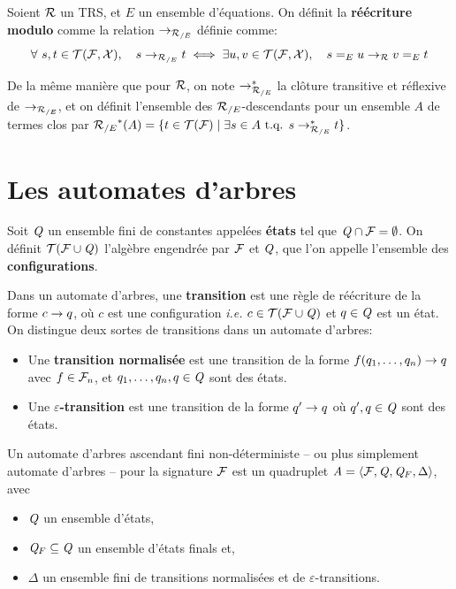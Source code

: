 \begin{definition}
  Soient $\mathcal R$ un TRS, et $E$ un ensemble d'équations. On définit la \textbf{réécriture modulo} comme la relation
  $\rightarrow_{\mathcal R_{/E}}$ définie comme:
  \[\forall\ s, t \in \mathcal{T(F, X)},\quad s \rightarrow_{\mathcal R_{/E}} t \; \Longleftrightarrow \; \exists u, v \in \mathcal{T(F, X)},\quad s =_E u \rightarrow_\mathcal R v =_E t\]
\end{definition}
De la même manière que pour $\mathcal R$, on note $\rightarrow_{\mathcal R_{/E}}^*$ la clôture transitive et réflexive de $\rightarrow_{\mathcal R_{/E}}$, et 
on définit l'ensemble des ${\mathcal R_{/E}}$-descendants pour un ensemble $A$ de termes clos par
${\mathcal R_{/E}}^*(A) = \{t \in \mathcal{T(F)} \; | \; \exists s \in A \mbox{ t.q. } s \rightarrow^*_{{\mathcal R_{/E}}} t \}$.

\section{Les automates d'arbres}
\label{sec:automates}

Soit $\mathit Q$ un ensemble fini de constantes appelées \textbf{états} tel que $\mathit Q \cap \mathcal{F}= \emptyset$.
On définit $\mathcal{ T(F \cup \mathit Q)}$ l'algèbre engendrée par $\mathcal{F}$ et $\mathit Q$, que l'on appelle l'ensemble des \textbf{configurations}.

\begin{definition}%
  \label{def:transitions}
  Dans un automate d'arbres, une \textbf{transition} est une règle de réécriture de la forme $c \rightarrow q$, où $c$ est une configuration
  \textit{i.e.} $c \in \mathcal{ T(F \cup \mathit Q)}$ et $q \in \mathit Q$ est un état. On distingue deux sortes de transitions dans un automate d'arbres:
  \begin{itemize}
  \item Une \textbf{transition normalisée} est une transition de la forme $f(q_1, \dots, q_n) \rightarrow q$
    avec $f \in \mathcal{F}_n$, et $q_1, \ldots, q_n, q \in \mathit Q$ sont des états.
  \item Une \textbf{$\varepsilon$-transition} est une transition de la forme $q' \rightarrow q$ où $q', q \in \mathit Q$ sont des états.
  \end{itemize}
\end{definition}


\begin{definition}%
  Un automate d'arbres ascendant fini non-déterministe -- ou plus simplement automate d'arbres --
  pour la signature $\mathcal{F}$ est un quadruplet $\mathit A= \langle \mathcal{F}, \mathit Q, \mathit Q_F,\Delta \rangle$,
  avec 
  \begin{itemize}
  \item $\mathit Q$ un ensemble d'états,
  \item $\mathit Q_F \subseteq \mathit Q$ un ensemble d'états finals et,
  \item $\Delta$ un ensemble fini de transitions normalisées et de $\varepsilon$-transitions.
  \end{itemize}
\end{definition}

